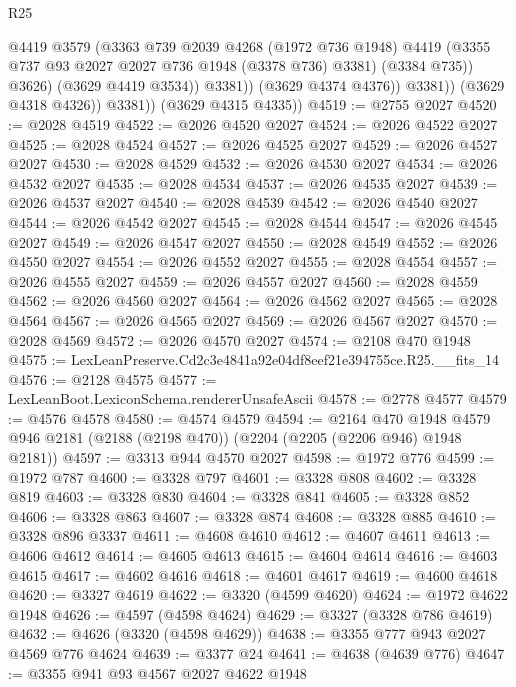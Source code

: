 \begin{lexlean}{R25}
\begin{coremodule}
                          @4419
                          @3579
                          (@3363
                            @739
                            @2039
                            @4268
                            (@1972 @736 @1948)
                            @4419
                            (@3355 @737 @93 @2027 @2027 @736 @1948 (@3378 @736) @3381)
                            (@3384 @735))
                          @3626)
                        (@3629 @4419 @3534))
                      @3381))
                  (@3629 @4374 @4376))
                @3381))
            (@3629 @4318 @4326))
          @3381))
      (@3629 @4315 @4335))
@4519 := @2755 @2027
@4520 := @2028 @4519
@4522 := @2026 @4520 @2027
@4524 := @2026 @4522 @2027
@4525 := @2028 @4524
@4527 := @2026 @4525 @2027
@4529 := @2026 @4527 @2027
@4530 := @2028 @4529
@4532 := @2026 @4530 @2027
@4534 := @2026 @4532 @2027
@4535 := @2028 @4534
@4537 := @2026 @4535 @2027
@4539 := @2026 @4537 @2027
@4540 := @2028 @4539
@4542 := @2026 @4540 @2027
@4544 := @2026 @4542 @2027
@4545 := @2028 @4544
@4547 := @2026 @4545 @2027
@4549 := @2026 @4547 @2027
@4550 := @2028 @4549
@4552 := @2026 @4550 @2027
@4554 := @2026 @4552 @2027
@4555 := @2028 @4554
@4557 := @2026 @4555 @2027
@4559 := @2026 @4557 @2027
@4560 := @2028 @4559
@4562 := @2026 @4560 @2027
@4564 := @2026 @4562 @2027
@4565 := @2028 @4564
@4567 := @2026 @4565 @2027
@4569 := @2026 @4567 @2027
@4570 := @2028 @4569
@4572 := @2026 @4570 @2027
@4574 := @2108 @470 @1948
@4575 := LexLeanPreserve.Cd2c3e4841a92e04df8eef21e394755ce.R25.__fits_14
@4576 := @2128 @4575
@4577 := LexLeanBoot.LexiconSchema.rendererUnsafeAscii
@4578 := @2778 @4577
@4579 := @4576 @4578
@4580 := @4574 @4579
@4594 := @2164
    @470
    @1948
    @4579
    @946
    @2181
    (@2188 (@2198 @470))
    (@2204 (@2205 (@2206 @946) @1948 @2181))
@4597 := @3313 @944 @4570 @2027
@4598 := @1972 @776
@4599 := @1972 @787
@4600 := @3328 @797
@4601 := @3328 @808
@4602 := @3328 @819
@4603 := @3328 @830
@4604 := @3328 @841
@4605 := @3328 @852
@4606 := @3328 @863
@4607 := @3328 @874
@4608 := @3328 @885
@4610 := @3328 @896 @3337
@4611 := @4608 @4610
@4612 := @4607 @4611
@4613 := @4606 @4612
@4614 := @4605 @4613
@4615 := @4604 @4614
@4616 := @4603 @4615
@4617 := @4602 @4616
@4618 := @4601 @4617
@4619 := @4600 @4618
@4620 := @3327 @4619
@4622 := @3320 (@4599 @4620)
@4624 := @1972 @4622 @1948
@4626 := @4597 (@4598 @4624)
@4629 := @3327 (@3328 @786 @4619)
@4632 := @4626 (@3320 (@4598 @4629))
@4638 := @3355 @777 @943 @2027 @4569 @776 @4624
@4639 := @3377 @24
@4641 := @4638 (@4639 @776)
@4647 := @3355 @941 @93 @4567 @2027 @4622 @1948

\end{coremodule}
\end{lexlean}
